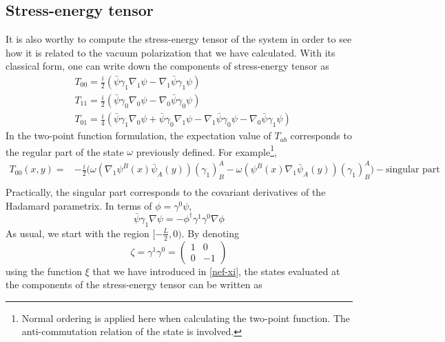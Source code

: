 \subsection{Stress-energy tensor}
It is also worthy to compute the stress-energy tensor of the system in order to see how it is related to the vacuum polarization that we have calculated.
With its classical form, one can write down the components of stress-energy tensor as
\begin{equation}
\begin{split}
& T_{00} = \frac{i}{2} (\bar{\psi} \gamma_1 \nabla_1 \psi - \nabla_1 \bar{\psi}\gamma_1 \psi)  \\
& T_{11} = \frac{i}{2} (\bar{\psi} \gamma_0 \nabla_0 \psi - \nabla_0 \bar{\psi}\gamma_0 \psi)  \\
& T_{01} = \frac{i}{4} (\bar{\psi} \gamma_1 \nabla_0 \psi +\bar{\psi} \gamma_0 \nabla_1 \psi - \nabla_1 \bar{\psi}\gamma_0 \psi - \nabla_0 \bar{\psi}\gamma_1 \psi)  
\end{split}
\end{equation}
In the two-point function formulation, the expectation value of $T_{ab}$ corresponds to the regular part of the state $\omega$ previously defined. For example\footnote{Normal ordering is applied here when calculating the two-point function. The anti-commutation relation of the state is involved.},
\begin{equation}
\begin{split}
T_{00}(x,y) = &
- \frac{i}{2}\big(\omega( \nabla_1 \psi^B(x) \bar{\psi}_A(y))(\gamma_1)^A_B - \omega( \psi^B(x) \nabla_1 \bar{\psi}_A(y))(\gamma_1)^A_B \big) - \textrm{singular part}  \\
\end{split}
\end{equation}
Practically, the singular part corresponds to the covariant derivatives of the Hadamard parametrix. In terms of $\phi = \gamma^0 \psi$, 
\begin{equation*}
\bar{\psi} \gamma_1 \nabla \psi = - \phi^\dagger \gamma^1 \gamma^0 \nabla \phi
\end{equation*}
As usual, we start with the region $[-\frac{L}{2}, 0)$. By denoting
\begin{equation*}
\zeta = \gamma^1 \gamma^0 = \begin{pmatrix}
1 & 0 \\
0 & -1
\end{pmatrix}
\end{equation*}
using the function $\xi$ that we have introduced in \cref{nef-xi}, the states evaluated at the components of the stress-energy tensor can be written as
